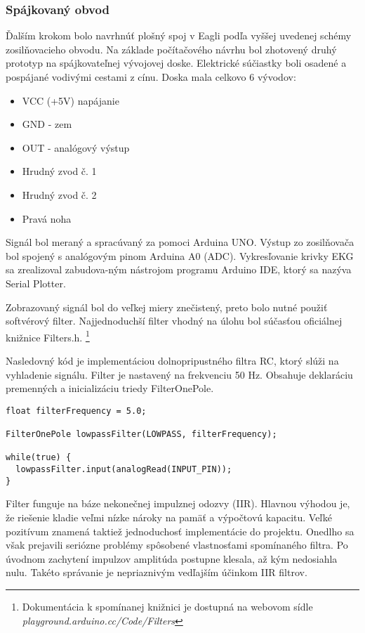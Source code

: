 \documentclass[titlepage,12pt]{article}
\begin{document}
\newpage
\subsubsection{Spájkovaný obvod}
Ďalším krokom bolo navrhnúť plošný spoj v Eagli podľa vyššej uvedenej schémy zosilňovacieho obvodu. Na základe počítačového návrhu bol zhotovený druhý prototyp na spájkovateľnej vývojovej doske. Elektrické súčiastky boli osadené a pospájané vodivými cestami z cínu. Doska mala celkovo 6 vývodov:
\begin{itemize}
	\item VCC (+5V) napájanie
	\item GND - zem
	\item OUT - analógový výstup
	\item Hrudný zvod č. 1
	\item Hrudný zvod č. 2
	\item Pravá noha
\end{itemize}
Signál bol meraný a spracúvaný za pomoci Arduina UNO. Výstup zo zosilňovača bol spojený \linebreak s analógovým pinom Arduina A0 (ADC). Vykresľovanie krivky EKG sa zrealizoval zabudova-ným nástrojom programu Arduino IDE, ktorý sa nazýva Serial Plotter.

Zobrazovaný signál bol do veľkej miery znečistený, preto bolo nutné použiť softvérový filter. Najjednoduchší filter vhodný na úlohu bol súčasťou oficiálnej knižnice Filters.h. \footnote{Dokumentácia k spomínanej knižnici je dostupná na webovom sídle \textit{playground.arduino.cc/Code/Filters}}

Nasledovný kód je implementáciou dolnopripustného filtra RC, ktorý slúži na vyhladenie signálu. Filter je nastavený na frekvenciu 50 Hz. Obsahuje deklaráciu premenných a inicializáciu triedy FilterOnePole.

\begin{lstlisting}
float filterFrequency = 5.0; 

FilterOnePole lowpassFilter(LOWPASS, filterFrequency);

while(true) {
  lowpassFilter.input(analogRead(INPUT_PIN));
}
\end{lstlisting}

Filter funguje na báze nekonečnej impulznej odozvy (IIR). Hlavnou výhodou je, že riešenie kladie veľmi nízke nároky na pamäť a výpočtovú kapacitu. Veľké pozitívum znamená taktiež jednoduchosť implementácie do projektu. Onedlho sa však prejavili seriózne problémy spôsobené vlastnosťami spomínaného filtra. Po úvodnom zachytení impulzov amplitúda postupne klesala, až kým nedosiahla nulu. Takéto správanie je nepriaznivým vedľajším účinkom IIR filtrov. 
\end{document}
